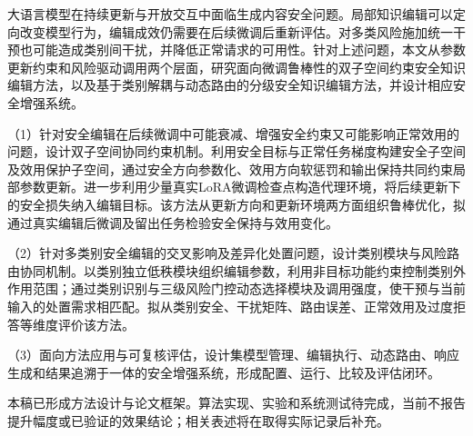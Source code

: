 \begin{cabstract}
大语言模型在持续更新与开放交互中面临生成内容安全问题。局部知识编辑可以定向改变模型行为，编辑成效仍需要在后续微调后重新评估。对多类风险施加统一干预也可能造成类别间干扰，并降低正常请求的可用性。针对上述问题，本文从参数更新约束和风险驱动调用两个层面，研究面向微调鲁棒性的双子空间约束安全知识编辑方法，以及基于类别解耦与动态路由的分级安全知识编辑方法，并设计相应安全增强系统。

（1）针对安全编辑在后续微调中可能衰减、增强安全约束又可能影响正常效用的问题，设计双子空间协同约束机制。利用安全目标与正常任务梯度构建安全子空间及效用保护子空间，通过安全方向参数化、效用方向软惩罚和输出保持共同约束局部参数更新。进一步利用少量真实LoRA微调检查点构造代理环境，将后续更新下的安全损失纳入编辑目标。该方法从更新方向和更新环境两方面组织鲁棒优化，拟通过真实编辑后微调及留出任务检验安全保持与效用变化。

（2）针对多类别安全编辑的交叉影响及差异化处置问题，设计类别模块与风险路由协同机制。以类别独立低秩模块组织编辑参数，利用非目标功能约束控制类别外作用范围；通过类别识别与三级风险门控动态选择模块及调用强度，使干预与当前输入的处置需求相匹配。拟从类别安全、干扰矩阵、路由误差、正常效用及过度拒答等维度评价该方法。

（3）面向方法应用与可复核评估，设计集模型管理、编辑执行、动态路由、响应生成和结果追溯于一体的安全增强系统，形成配置、运行、比较及评估闭环。

本稿已形成方法设计与论文框架。算法实现、实验和系统测试待完成，当前不报告提升幅度或已验证的效果结论；相关表述将在取得实际记录后补充。

\end{cabstract}

